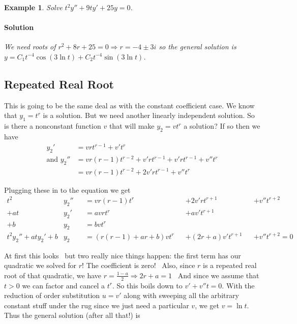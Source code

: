 \documentclass[letterpaper, 11pt, openany]{book}
\theoremstyle{mytheoremstyle}
\theoremstyle{myexamplestyle}
\newtheorem{example}{Example}[section]
\newenvironment{solution}{\paragraph{\sffamily \smaller \fontseries{b}\selectfont Solution}}{\hfill\faSquare}
\begin{document}
\begin{example}
    Solve \(t^2y'' +9ty' + 25y = 0\).
    \begin{solution}
        We need roots of \(r^2 + 8r + 25 = 0 \Rightarrow r = -4 \pm 3i\) so the general solution is \(y = C_1 t^{-4} \cos (3\ln t) + C_2 t^{-4} \sin (3\ln t)\).
    \end{solution} 
\end{example}

\subsection{Repeated Real Root}

This is going to be the same deal as with the constant coefficient case. We know that \(y_1 = t^r\) is a solution. But we need another linearly independent solution. So is there a nonconstant function \(v\) that will make \(y_2 = v t^r\) a solution? If so then we have
\begin{align*}
    y_2 ' &= v r t^{r-1} + v' t^{r}\\
    \text {and }  y_2 '' &= v r (r-1) t^{r-2} + v' r t^{r-1} + v' r t^{r-1} + v'' t^{r}\\
                            &= v r (r-1) t^{r-2} + 2v' r t^{r-1} + v'' t^{r}
\end{align*}

Plugging these in to the equation we get
\[
\begin{alignedat}{5}
    t^2 &y_2 ''&&= v r (r-1) t^{r} &&+ 2v' r t^{r+1} &&+ v'' t^{r+2}\\
    + at &y_2 ' &&= a v r t^{r} && + a v' t^{r+ 1}\\
    + b &y_2   &&= bvt^{r}\\
    \hline
    t^2 y_2 '' + aty_2 ' + b&y_2  &&= (r(r-1) + ar + b)vt^{r} &&+ (2r+a)v' t^{r+1} &&+  v'' t^{r+2} = 0
\end{alignedat}
\]

At first this looks \faDizzy \ but two really nice things happen: the first term has our quadratic we solved for \(r\)! The coefficient is zero! \faLaugh \ Also, since \(r\) is a repeated real root of that quadratic, we have \(r = \frac{1-a}{2} \Rightarrow 2r+a = 1\) \faLaugh \ And since we assume that \(t > 0\) we can factor and cancel a \(t^{r}\). So this boils down to \(v' + v''t = 0\). With the reduction of order substitution \(u = v'\) along with sweeping all the arbitrary constant stuff under the rug since we just need a particular \(v\), we get \(v = \ln t\). Thus the general solution (after all that!) is
\end{document}
